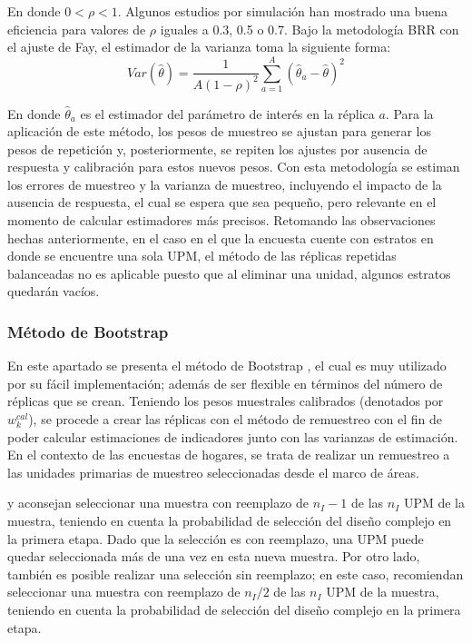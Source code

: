 \documentclass[
  10pt,
  spanish,
]{book}
\begin{document}
En donde \(0<\rho<1\). Algunos estudios por simulación han mostrado una buena eficiencia para valores de \(\rho\) iguales a 0.3, 0.5 o 0.7. Bajo la metodología BRR con el ajuste de Fay, el estimador de la varianza toma la siguiente forma:
\[
Var(\hat{\theta}) = \frac{1}{A(1-\rho)^2}\sum_{a=1}^A(\hat{\theta}_a - \hat\theta )^2
\]

En donde \(\hat{\theta}_a\) es el estimador del parámetro de interés en la réplica \(a\). Para la aplicación de este método, los pesos de muestreo se ajustan para generar los pesos de repetición y, posteriormente, se repiten los ajustes por ausencia de respuesta y calibración para estos nuevos pesos. Con esta metodología se estiman los errores de muestreo y la varianza de muestreo, incluyendo el impacto de la ausencia de respuesta, el cual se espera que sea pequeño, pero relevante en el momento de calcular estimadores más precisos. Retomando las observaciones hechas anteriormente, en el caso en el que la encuesta cuente con estratos en donde se encuentre una sola UPM, el método de las réplicas repetidas balanceadas no es aplicable puesto que al eliminar una unidad, algunos estratos quedarán vacíos.

\hypertarget{muxe9todo-de-bootstrap}{%
\subsubsection*{Método de Bootstrap}\label{muxe9todo-de-bootstrap}}

En este apartado se presenta el método de Bootstrap \citep{EfroTibs93}, el cual es muy utilizado por su fácil implementación; además de ser flexible en términos del número de réplicas que se crean. Teniendo los pesos muestrales calibrados (denotados por \(w_k^{cal}\)), se procede a crear las réplicas con el método de remuestreo con el fin de poder calcular estimaciones de indicadores junto con las varianzas de estimación. En el contexto de las encuestas de hogares, se trata de realizar un remuestreo a las unidades primarias de muestreo seleccionadas desde el marco de áreas.

\citet{Rao_Wu_1984} y \citet{Rao_Wu_1988} aconsejan seleccionar una muestra con reemplazo de \(n_I - 1\) de las \(n_I\) UPM de la muestra, teniendo en cuenta la probabilidad de selección del diseño complejo en la primera etapa. Dado que la selección es con reemplazo, una UPM puede quedar seleccionada más de una vez en esta nueva muestra. Por otro lado, también es posible realizar una selección sin reemplazo; en este caso, \citet{Preston_2009} recomiendan seleccionar una muestra con reemplazo de \(n_I/2\) de las \(n_I\) UPM de la muestra, teniendo en cuenta la probabilidad de selección del diseño complejo en la primera etapa.
\end{document}
